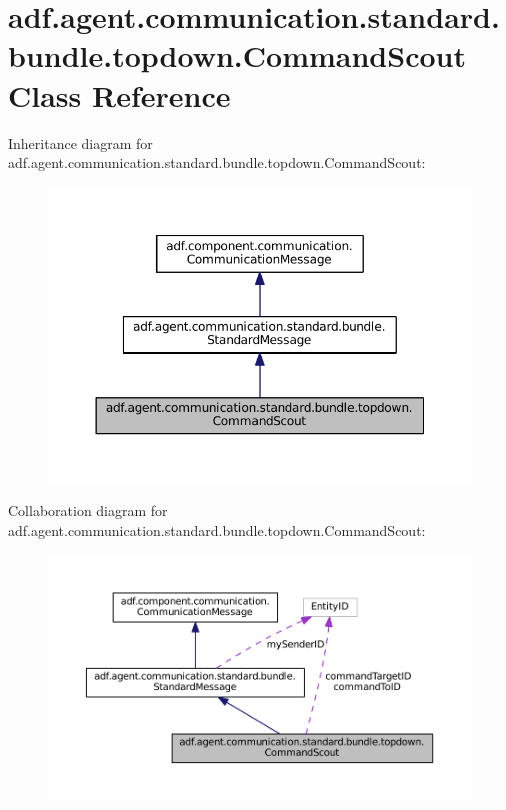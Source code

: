 \hypertarget{classadf_1_1agent_1_1communication_1_1standard_1_1bundle_1_1topdown_1_1CommandScout}{}\section{adf.\+agent.\+communication.\+standard.\+bundle.\+topdown.\+Command\+Scout Class Reference}
\label{classadf_1_1agent_1_1communication_1_1standard_1_1bundle_1_1topdown_1_1CommandScout}


Inheritance diagram for adf.\+agent.\+communication.\+standard.\+bundle.\+topdown.\+Command\+Scout\+:
\nopagebreak
\begin{figure}[H]
\begin{center}
\leavevmode
\includegraphics[width=350pt]{classadf_1_1agent_1_1communication_1_1standard_1_1bundle_1_1topdown_1_1CommandScout__inherit__graph}
\end{center}
\end{figure}


Collaboration diagram for adf.\+agent.\+communication.\+standard.\+bundle.\+topdown.\+Command\+Scout\+:
\nopagebreak
\begin{figure}[H]
\begin{center}
\leavevmode
\includegraphics[width=350pt]{classadf_1_1agent_1_1communication_1_1standard_1_1bundle_1_1topdown_1_1CommandScout__coll__graph}
\end{center}
\end{figure}
